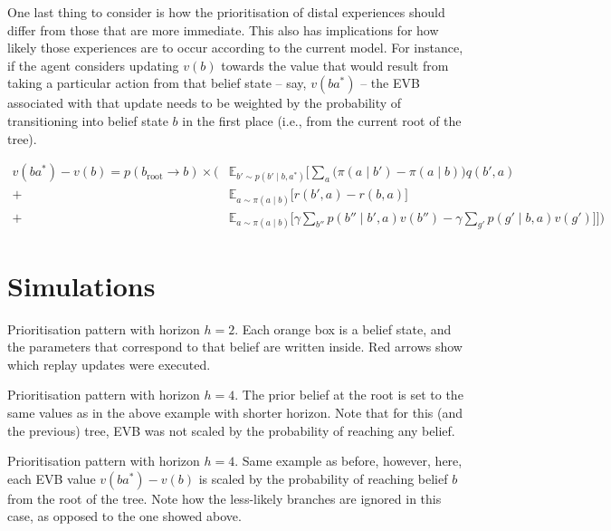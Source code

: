 \documentclass{article}
\begin{document}
One last thing to consider is how the prioritisation of distal experiences should 
differ from those that are more immediate. This also has implications for how likely 
those experiences are to occur according to the current model. 
\bigbreak
For instance, if the agent considers updating $v(b)$ towards the value that would result 
from taking a particular action from that belief state -- say, $v(ba^*)$ -- the EVB associated 
with that update needs to be weighted by the probability of transitioning into 
belief state $b$ in the first place (i.e., from the current root of the tree).

\begin{align}
    v(ba^*)-v(b) = p(b_{\text{root}}\rightarrow b) \times  
    \Big(&\mathbb{E}_{b'\sim p(b'\mid b, a^*)}\Big[\sum_a \big(\pi(a\mid b')-\pi(a\mid b)\big)q(b',a) \\
    +& \mathbb{E}_{a\sim \pi(a\mid b)}\big[r(b',a) - r(b,a)\big] \nonumber \\ 
    +& \mathbb{E}_{a\sim \pi(a\mid b)}\big[\gamma \sum_{b''}p(b''\mid b', a)v(b'') - \gamma \sum_{g'}p(g'\mid b, a)v(g') \big] \Big] \Big) \nonumber
\end{align}

\newpage
\section*{Simulations}

Prioritisation pattern with horizon $h=2$. Each orange box is a belief state, and 
the parameters that correspond to that belief are written inside. Red arrows show 
which replay updates were executed.
\vspace{1cm}



\newpage
Prioritisation pattern with horizon $h=4$. The prior belief at the root is set to the 
same values as in the above example with shorter horizon. Note that for this (and the 
previous) tree, EVB was not scaled by the probability of reaching any belief.
\vspace{1cm}



\newpage
Prioritisation pattern with horizon $h=4$. Same example as before, however, here, each 
EVB value $v(ba^*)-v(b)$ is scaled by the probability of reaching belief $b$ from the root 
of the tree. Note how the less-likely branches are ignored in this case, as opposed to the 
one showed above.
\vspace{1cm}
\end{document}
